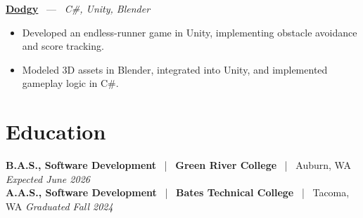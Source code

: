 \documentclass[10pt, letterpaper]{article}
\newcommand{\jobhead}[4]{%
  \vspace{5pt}%
  {\bfseries\color{dark}#1}%
  ~{\color{light}|}~%
  {\bfseries\color{navy}#2}%
  ~{\color{light}|}~%
  {\color{light}#3}%
  \hfill{\color{light}\small\textit{#4}}\\[-2pt]%
}
\newcommand{\projhead}[3]{%
  \vspace{5pt}%
  {\bfseries\color{dark}\href{#2}{#1}}%
  ~{\color{light}---}~%
  {\color{light}\small\textit{#3}}\\[-2pt]%
}
\begin{document}
\projhead{Dodgy}{https://timyd.itch.io/dodgy}{C\#, Unity, Blender}
\begin{itemize}
  \item Developed an endless-runner game in Unity, implementing obstacle avoidance and score tracking.
  \item Modeled 3D assets in Blender, integrated into Unity, and implemented gameplay logic in C\#.
\end{itemize}

\section{Education}

\jobhead{B.A.S., Software Development}{Green River College}{Auburn, WA}{Expected June 2026}
\jobhead{A.A.S., Software Development}{Bates Technical College}{Tacoma, WA}{Graduated Fall 2024}
\end{document}
